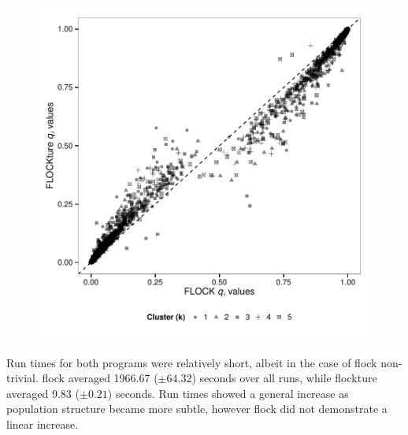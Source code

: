 \begin{figure}
\begin{minipage}{.45\textwidth}
  \includegraphics[width=.9\linewidth]{images/Figures-Pat/FlockvFlockture_qi.pdf}
  \label{fig:FvFqi}
\end{minipage}
\end{figure}

Run times for both programs were relatively short, albeit in the case of {\sc flock} 
non-trivial. {\sc flock} averaged 1966.67 ($\pm 64.32$) seconds
over all runs, while {\sc flockture} averaged 9.83 ($\pm 0.21$) seconds. Run times showed a 
general increase as population structure became more subtle, however {\sc flock} did not 
demonstrate a linear increase. %

